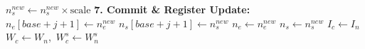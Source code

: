 \documentclass{article}
\begin{document}
\begin{algorithm}[H]
{{        $n_s^{new} \gets n_s^{new} \times \text{scale}$ 
    }
    \BlankLine
    \textbf{7. Commit \& Register Update:} \\
    $n_e[base + j + 1] \gets n_e^{new}$ 
    $n_s[base + j + 1] \gets n_s^{new}$ 
    $n_e \gets n_e^{new}$ 
    $n_s \gets n_s^{new}$ 
    $I_c \gets I_n$ 
    $W_c \gets W_n$,\ $W_c^{s} \gets W_n^{s}$ 
}
\caption{Two-population plasma rate-equation solver (Part 2/2): sequential trapezoidal time-stepping per radial point.}
\label{alg:rate_kernel_2}
\end{algorithm}

\newpage
\end{document}
